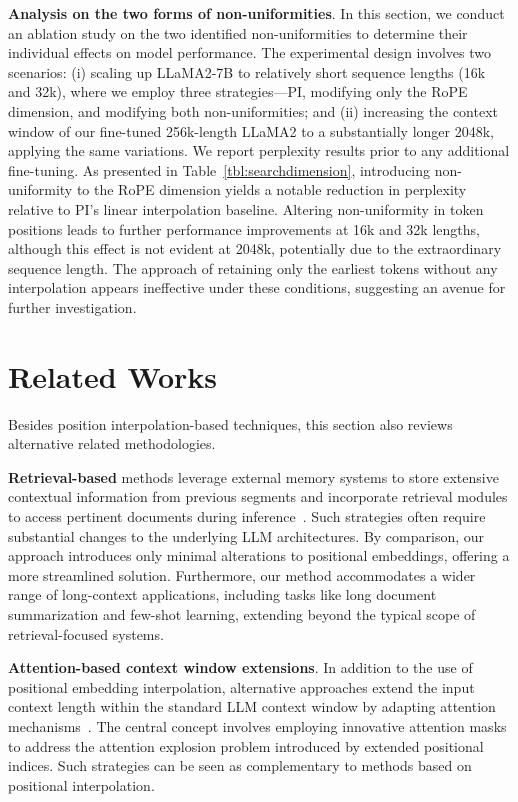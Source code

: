 \textbf{Analysis on the two forms of non-uniformities}. In this section, we conduct an ablation study on the two identified non-uniformities to determine their individual effects on model performance. The experimental design involves two scenarios: (i) scaling up LLaMA2-7B to relatively short sequence lengths (16k and 32k), where we employ three strategies—PI, modifying only the RoPE dimension, and modifying both non-uniformities; and (ii) increasing the context window of our fine-tuned 256k-length LLaMA2 to a substantially longer 2048k, applying the same variations. We report perplexity results prior to any additional fine-tuning. As presented in Table~\ref{tbl:searchdimension}, introducing non-uniformity to the RoPE dimension yields a notable reduction in perplexity relative to PI’s linear interpolation baseline. Altering non-uniformity in token positions leads to further performance improvements at 16k and 32k lengths, although this effect is not evident at 2048k, potentially due to the extraordinary sequence length. The approach of retaining only the earliest tokens without any interpolation appears ineffective under these conditions, suggesting an avenue for further investigation.

\section{Related Works}

Besides position interpolation-based techniques, this section also reviews alternative related methodologies.

\textbf{Retrieval-based} methods leverage external memory systems to store extensive contextual information from previous segments and incorporate retrieval modules to access pertinent documents during inference~\cite{longllama,wang2023augmenting,borgeaud2022improving}. Such strategies often require substantial changes to the underlying LLM architectures. By comparison, our approach introduces only minimal alterations to positional embeddings, offering a more streamlined solution. Furthermore, our method accommodates a wider range of long-context applications, including tasks like long document summarization and few-shot learning, extending beyond the typical scope of retrieval-focused systems.

\textbf{Attention-based context window extensions}. In addition to the use of positional embedding interpolation, alternative approaches extend the input context length within the standard LLM context window by adapting attention mechanisms~\cite{han2023lminfinite, streamingllm,parallelwindow}. The central concept involves employing innovative attention masks to address the attention explosion problem introduced by extended positional indices. Such strategies can be seen as complementary to methods based on positional interpolation.


